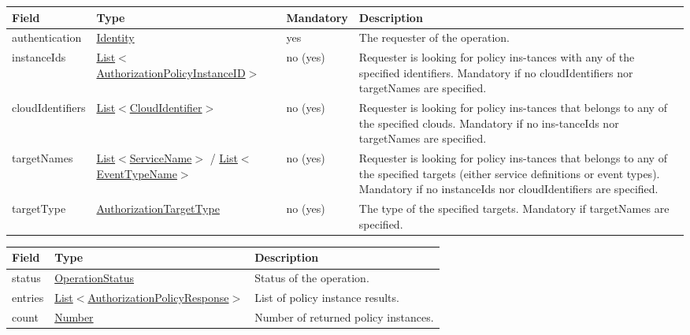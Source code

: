 \documentclass[a4paper]{arrowhead}
\newcommand{\pref}[1]{{\textcolor{ArrowheadGrey}{\hyperref[sec:model:primitives:#1]{#1}}}}
\begin{document}
\clearpage


\begin{table}[ht!]
\begin{tabularx}{\textwidth}{| p{3cm} | p{5.5cm} | p{2cm} | X |} \hline
\rowcolor{gray!33} Field & Type & Mandatory & Description \\ \hline
authentication &\hyperref[sec:model:Identity]{Identity} & yes & The requester of the operation. \\ \hline
instanceIds & \pref{List}$<$\pref{AuthorizationPolicyInstanceID}$>$ & no (yes) & Requester is looking for policy ins-tances with any of the specified identifiers. Mandatory if no cloudIdentifiers nor targetNames are specified. \\ \hline
cloudIdentifiers & \pref{List}$<$\pref{CloudIdentifier}$>$ & no (yes) & Requester is looking for policy ins-tances that belongs to any of the specified clouds. Mandatory if no ins-tanceIds nor targetNames are specified. \\ \hline
targetNames & \pref{List}$<$\pref{ServiceName}$>$ / \pref{List}$<$\pref{EventTypeName}$>$ & no (yes) & Requester is looking for policy ins-tances that belongs to any of the specified targets (either service definitions or event types). Mandatory if no instanceIds nor cloudIdentifiers are specified. \\ \hline
targetType & \pref{AuthorizationTargetType} & no (yes) & The type of the specified targets. Mandatory if targetNames are specified. \\ \hline
\end{tabularx}
\end{table}


\begin{table}[ht!]
\begin{tabularx}{\textwidth}{| p{2.5cm} | p{5.5cm} | X |} \hline
\rowcolor{gray!33} Field & Type    & Description \\ \hline
status & \pref{OperationStatus} & Status of the operation. \\ \hline
entries & \pref{List}$<$\hyperref[sec:model:AuthorizationPolicyResponse]{AuthorizationPolicyResponse}$>$  & List of policy instance results. \\ \hline
count & \pref{Number} & Number of returned policy instances. \\ \hline
\end{tabularx}
\end{table}
\end{document}
